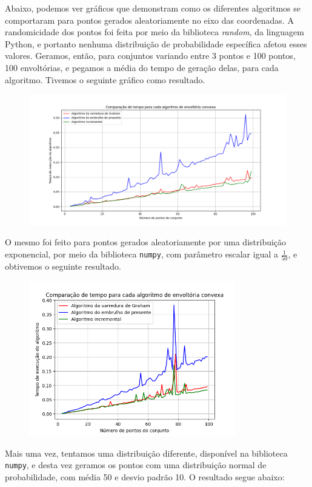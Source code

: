 \documentclass{article}
\begin{document}
Abaixo, podemos ver gráficos que demonstram como os diferentes algoritmos se comportaram para pontos gerados aleatoriamente no eixo das coordenadas. A randomicidade dos pontos foi feita por meio da biblioteca \textit{random}, da linguagem Python, e portanto nenhuma distribuição de probabilidade específica afetou esses valores. Geramos, então, para conjuntos variando entre 3 pontos e 100 pontos, 100 envoltórias, e pegamos a média do tempo de geração delas, para cada algoritmo. Tivemos o seguinte gráfico como resultado.

\begin{figure} [H]
	\includegraphics[width=12cm]{uniform.png}
	\centering
\end{figure}

O mesmo foi feito para pontos gerados aleatoriamente por uma distribuição exponencial, por meio da biblioteca \texttt{numpy}, com parâmetro escalar igual a \( \frac{1}{50} \), e obtivemos o seguinte resultado.

\begin{figure} [H]
	\includegraphics[width=9cm]{exponential.png}
	\centering
\end{figure}

Mais uma vez, tentamos uma distribuição diferente, disponível na biblioteca \texttt{numpy}, e desta vez geramos os pontos com uma distribuição normal de probabilidade, com média 50 e desvio padrão 10. O resultado segue abaixo:
\end{document}
